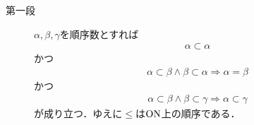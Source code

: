 	\begin{prf}\mbox{}
		\begin{description}
			\item[第一段]
				$\alpha,\beta,\gamma$を順序数とすれば
				\begin{align}
					\alpha \subset \alpha
				\end{align}
				かつ
				\begin{align}
					\alpha \subset \beta \wedge \beta \subset \alpha \Longrightarrow \alpha = \beta
				\end{align}
				かつ
				\begin{align}
					\alpha \subset \beta \wedge \beta \subset \gamma \Longrightarrow \alpha \subset \gamma
				\end{align}
				が成り立つ．ゆえに$\leq$は$\mathrm{ON}$上の順序である．
				

\end{description}
\end{prf}
